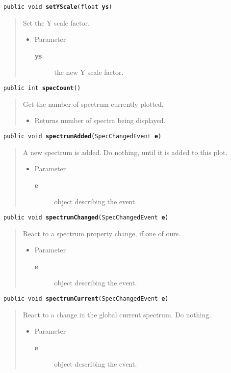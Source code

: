 \documentclass[twoside,11pt,nolof]{starlink}
\providecommand{\method}[1]{\texttt{#1}}
\newenvironment{desc}{\begin{quote}}{\end{quote}}
\begin{document}
\method{public void \textbf{setYScale}(\texttt{float} \textbf{ys})\label{l212}\label{l213}}
\begin{desc}Set the Y scale factor.
\begin{itemize}
\item{Parameter
  \begin{description}
   \item[\textbf{ys}]{the new Y scale factor.}
  \end{description}}
\end{itemize}
\end{desc}

\method{public int \textbf{specCount}()\label{l214}\label{l215}}
\begin{desc}Get the number of spectrum currently plotted.
\begin{itemize}
\item{Returns number of spectra being displayed. }
\end{itemize}
\end{desc}

\method{public void \textbf{spectrumAdded}(\texttt{SpecChangedEvent} \textbf{e})\label{l216}\label{l217}}
\begin{desc}A new spectrum is added. Do nothing, until it is added to this
 plot.
\begin{itemize}
\item{Parameter
  \begin{description}
   \item[\textbf{e}]{object describing the event.}
  \end{description}}
\end{itemize}
\end{desc}

\method{public void \textbf{spectrumChanged}(\texttt{SpecChangedEvent} \textbf{e})\label{l218}\label{l219}}
\begin{desc}React to a spectrum property change, if one of ours.
\begin{itemize}
\item{Parameter
  \begin{description}
   \item[\textbf{e}]{object describing the event.}
  \end{description}}
\end{itemize}
\end{desc}

\method{public void \textbf{spectrumCurrent}(\texttt{SpecChangedEvent} \textbf{e})\label{l220}\label{l221}}
\begin{desc}React to a change in the global current spectrum. Do nothing.
\begin{itemize}
\item{Parameter
  \begin{description}
   \item[\textbf{e}]{object describing the event.}
  \end{description}}
\end{itemize}
\end{desc}
\end{document}
